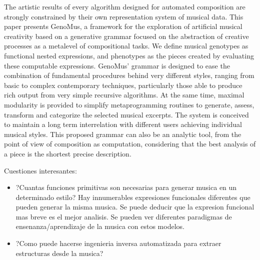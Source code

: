 \documentclass{article}
\begin{document}
The artistic results of every algorithm designed for automated composition
are strongly constrained by their own representation
system of musical data. This paper presents GenoMus, a
framework for the exploration of artificial musical creativity
based on a generative grammar focused on the abstraction
of creative processes as a metalevel of compositional
tasks. We define musical genotypes as functional
nested expressions, and phenotypes as the pieces created
by evaluating these computable expressions. GenoMus' grammar is designed 
to ease the combination of fundamental procedures behind very different styles, ranging from basic to complex contemporary
techniques, particularly those able to produce rich
output from very simple recursive algorithms. At the same
time, maximal modularity is provided to simplify metaprogramming
routines to generate, assess, transform and categorize
the selected musical excerpts. The system is conceived
to maintain a long term interrelation with different
users achieving individual musical styles. This proposed
grammar can also be an analytic tool, from the point of
view of composition as computation, considering that the
best analysis of a piece is the shortest precise description.

{\color{gray}

Cuestiones interesantes: 
\begin{itemize}
\item ?Cuantas funciones primitivas son necesarias para generar musica en un determinado estilo? Hay innumerables expresiones funcionales diferentes que pueden generar la misma musica. Se puede deducir que la expresion funcional mas breve es el mejor analisis. Se pueden ver diferentes paradigmas de ensenanza/aprendizaje de la musica con estos modelos.
\item ?Como puede hacerse ingenieria inversa automatizada para extraer estructuras desde la musica?
\end{itemize}
}

  
  
\end{document}
